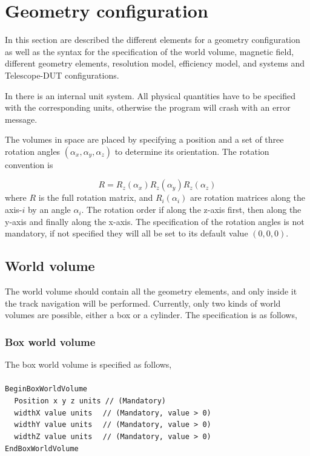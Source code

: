 \section{Geometry configuration}
\label{sec:GeoConf}

In this section are described the different elements for a geometry configuration as well as 
the syntax for the specification of the world volume, magnetic field, different geometry elements, 
resolution model, efficiency model, and systems and Telescope-DUT configurations.

In {\guari} there is an internal unit system. All physical quantities have to be specified with the corresponding units, 
otherwise the program will crash with an error message.

The volumes in space are placed by specifying a position and a set of three rotation angles $(\alpha_x,\alpha_y,\alpha_z)$ to 
determine its orientation. The rotation convention is 

\begin{equation}
  R = R_z(\alpha_x) R_z(\alpha_y) R_z(\alpha_z) 
\end{equation}
\noindent
where $R$ is the full rotation matrix, and $R_i(\alpha_i)$ are rotation matrices along the axis-$i$ by an angle $\alpha_i$. 
The rotation order if along the z-axis first, then along the y-axis and finally along the x-axis. The specification of the 
rotation angles is not mandatory, if not specified they will all be set to its default value $(0,0,0)$.


\subsection{World volume}

The world volume should contain all the geometry elements, and only inside it the track navigation will 
be performed. Currently, only two kinds of world volumes are possible, either a box or a cylinder. The specification 
is as follows,

\subsubsection{Box world volume}

The box world volume is specified as follows,
~\\
~\\
\noindent
{\tt BeginBoxWorldVolume} \\
$~~~~~${\tt Position   x   y   z  units   // (Mandatory)} \\
$~~~~~${\tt widthX     value  units  $~$  // (Mandatory, value > 0)} \\
$~~~~~${\tt widthY     value  units  $~$  // (Mandatory, value > 0)} \\
$~~~~~${\tt widthZ     value  units  $~$  // (Mandatory, value > 0)} \\
{\tt EndBoxWorldVolume} \\

